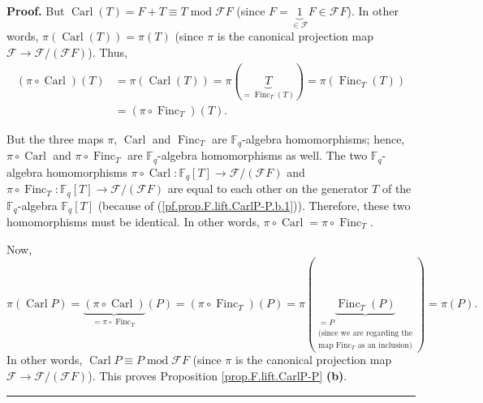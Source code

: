 \documentclass[numbers=enddot,12pt,final,onecolumn,notitlepage]{scrartcl}%
\theoremstyle{definition}
\newenvironment{proof}[1][Proof]{\noindent\textbf{#1.} }{\ \rule{0.5em}{0.5em}}
\begin{document}
\begin{proof}
But $\operatorname*{Carl}\left(  T\right)  =F+T\equiv T\operatorname{mod}%
\mathcal{F}F$ (since $F=\underbrace{1}_{\in\mathcal{F}}F\in\mathcal{F}F$). In
other words, $\pi\left(  \operatorname*{Carl}\left(  T\right)  \right)
=\pi\left(  T\right)  $ (since $\pi$ is the canonical projection map
$\mathcal{F}\rightarrow\mathcal{F}/\left(  \mathcal{F}F\right)  $). Thus,
\begin{align}
\left(  \pi\circ\operatorname*{Carl}\right)  \left(  T\right)   &  =\pi\left(
\operatorname*{Carl}\left(  T\right)  \right)  =\pi\left(  \underbrace{T}%
_{=\operatorname*{Finc}\nolimits_{T}\left(  T\right)  }\right)  =\pi\left(
\operatorname*{Finc}\nolimits_{T}\left(  T\right)  \right) \nonumber\\
&  =\left(  \pi\circ\operatorname*{Finc}\nolimits_{T}\right)  \left(
T\right)  . \label{pf.prop.F.lift.CarlP-P.b.1}%
\end{align}


But the three maps $\pi$, $\operatorname*{Carl}$ and $\operatorname*{Finc}%
\nolimits_{T}$ are $\mathbb{F}_{q}$-algebra homomorphisms; hence, $\pi
\circ\operatorname*{Carl}$ and $\pi\circ\operatorname*{Finc}\nolimits_{T}$ are
$\mathbb{F}_{q}$-algebra homomorphisms as well. The two $\mathbb{F}_{q}%
$-algebra homomorphisms $\pi\circ\operatorname*{Carl}:\mathbb{F}_{q}\left[
T\right]  \rightarrow\mathcal{F}/\left(  \mathcal{F}F\right)  $ and $\pi
\circ\operatorname*{Finc}\nolimits_{T}:\mathbb{F}_{q}\left[  T\right]
\rightarrow\mathcal{F}/\left(  \mathcal{F}F\right)  $ are equal to each other
on the generator $T$ of the $\mathbb{F}_{q}$-algebra $\mathbb{F}_{q}\left[
T\right]  $ (because of (\ref{pf.prop.F.lift.CarlP-P.b.1})). Therefore, these
two homomorphisms must be identical. In other words, $\pi\circ
\operatorname*{Carl}=\pi\circ\operatorname*{Finc}\nolimits_{T}$.

Now,
\[
\pi\left(  \operatorname*{Carl}P\right)  =\underbrace{\left(  \pi
\circ\operatorname*{Carl}\right)  }_{=\pi\circ\operatorname*{Finc}%
\nolimits_{T}}\left(  P\right)  =\left(  \pi\circ\operatorname*{Finc}%
\nolimits_{T}\right)  \left(  P\right)  =\pi\left(
\underbrace{\operatorname*{Finc}\nolimits_{T}\left(  P\right)  }%
_{\substack{=P\\\text{(since we are regarding the}\\\text{map }%
\operatorname*{Finc}\nolimits_{T}\text{ as an inclusion)}}}\right)
=\pi\left(  P\right)  .
\]
In other words, $\operatorname*{Carl}P\equiv P\operatorname{mod}\mathcal{F}F$
(since $\pi$ is the canonical projection map $\mathcal{F}\rightarrow
\mathcal{F}/\left(  \mathcal{F}F\right)  $). This proves Proposition
\ref{prop.F.lift.CarlP-P} \textbf{(b)}.
\end{proof}
\end{document}
